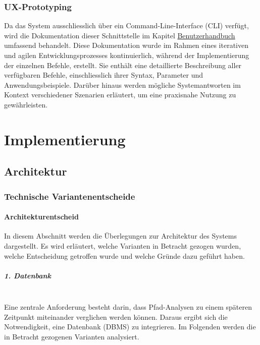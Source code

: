 \documentclass[a4paper,12pt]{report}
\begin{document}
    \newpage

    \subsection{UX-Prototyping}\label{subsec:ux-prototyping}
    Da das System ausschliesslich über ein Command-Line-Interface (CLI) verfügt,
    wird die Dokumentation dieser Schnittstelle im Kapitel \hyperref[sec:user-manual]{Benutzerhandbuch}
    umfassend behandelt.
    Diese Dokumentation wurde im Rahmen eines iterativen und agilen Entwicklungsprozesses
    kontinuierlich, während der Implementierung der einzelnen Befehle, erstellt.
    Sie enthält eine detaillierte Beschreibung aller verfügbaren Befehle, einschliesslich ihrer Syntax, Parameter und Anwendungsbeispiele.
    Darüber hinaus werden mögliche Systemantworten im Kontext verschiedener Szenarien erläutert,
    um eine praxisnahe Nutzung zu gewährleisten.


    \chapter{Implementierung}


    \section{Architektur}

    \subsection{Technische Variantenentscheide}\label{subsec:technische-variantenentscheide}

    \subsubsection{Architekturentscheid}
    In diesem Abschnitt werden die Überlegungen zur Architektur des Systems dargestellt.
    Es wird erläutert, welche Varianten in Betracht gezogen wurden, welche Entscheidung getroffen wurde und welche Gründe dazu geführt haben.

    \paragraph*{1. Datenbank}\mbox{}\\
    Eine zentrale Anforderung besteht darin, dass Pfad-Analysen zu einem späteren Zeitpunkt miteinander verglichen werden können.
    Daraus ergibt sich die Notwendigkeit, eine Datenbank (DBMS) zu integrieren.
    Im Folgenden werden die in Betracht gezogenen Varianten analysiert.
\end{document}
